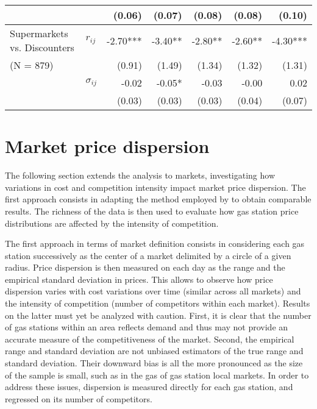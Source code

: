 \documentclass[english]{article}
\begin{document}
\begin{table}[H]
\begin{threeparttable}
\begin{tabular}{llrrrrr}
          &       & (0.06) & (0.07) & (0.08) & (0.08) & (0.10) \\
\midrule
    \multicolumn{1}{l}{Supermarkets vs. Discounters} & \multicolumn{1}{l}{$r_{ij}$} & -2.70*** & -3.40** & -2.80** & -2.60** & -4.30*** \\
    \multicolumn{1}{l}{(N = 879)} &       & (0.91) & (1.49) & (1.34) & (1.32) & (1.31) \\
          & \multicolumn{1}{l}{$\sigma_{ij}$} & -0.02 & -0.05* & -0.03 & -0.00 & 0.02 \\
          &       & (0.03) & (0.03) & (0.03) & (0.04) & (0.07) \\
\bottomrule
\bottomrule
\end{tabular}
\end{threeparttable}
\end{table}

\section{Market price dispersion}

The following section extends the analysis to markets, investigating how variations in cost and competition intensity impact market price dispersion. The first approach consists in adapting the method employed by \cite{TAP11} to obtain comparable results. The richness of the data is then used to evaluate how gas station price distributions are affected by the intensity of competition.

The first approach in terms of market definition consists in considering each gas station successively as the center of a market delimited by a circle of a given radius. Price dispersion is then measured on each day as the range and the empirical standard deviation in prices. This allows to observe how price dispersion varies with cost variations over time (similar across all markets) and the intensity of competition (number of competitors within each market). Results on the latter must yet be analyzed with caution. First, it is clear that the number of gas stations within an area reflects demand and thus may not provide an accurate measure of the competitiveness of the market. Second, the empirical range and standard deviation are not unbiased estimators of the true range and standard deviation. Their downward bias is all the more pronounced as the size of the sample is small, such as in the gas of gas station local markets. In order to address these issues, dispersion is measured directly for each gas station, and regressed on its number of competitors.
\end{document}

